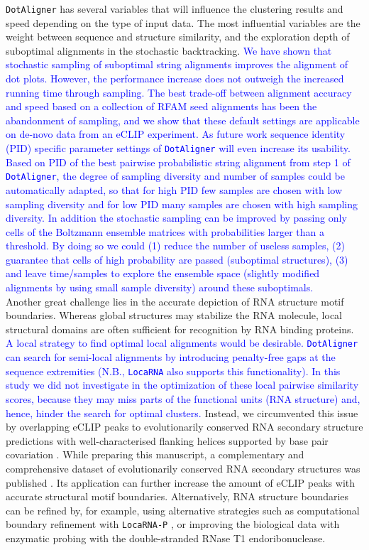 \documentclass{bmcart}
\newcommand\dotaligner{\texttt{DotAligner}}
\newcommand\locarna{\texttt{LocaRNA}}
\begin{document}
\dotaligner{} has several variables that will influence the clustering results and 
speed depending on the type of input data. The most influential variables are 
the weight between sequence and structure similarity,
and the exploration depth of suboptimal alignments in the stochastic
backtracking.
\textcolor{blue} {
We have shown that stochastic sampling of suboptimal string alignments improves
the alignment of dot plots. However, the performance increase does not outweigh
the increased running time through sampling. The best trade-off between
alignment accuracy and speed based on a collection of RFAM seed alignments has
been the abandonment of sampling, and we show that these default settings are
applicable on de-novo data from an eCLIP experiment.  As future work sequence
identity (PID) specific parameter settings of \dotaligner{} will even increase its
usability. Based on PID of the best pairwise probabilistic
string alignment from step 1 of \dotaligner, the degree of sampling diversity
and number of samples could be automatically
adapted, so that for high PID few samples are chosen with low sampling diversity and for
low PID many samples are chosen with high sampling diversity.
In addition the stochastic sampling can be improved by passing only
cells of the Boltzmann ensemble matrices with probabilities larger than a
threshold. By doing so we could (1) reduce the number of useless
samples, (2) guarantee that cells of high probability are passed (suboptimal
structures), (3) and leave time/samples to explore the ensemble space (slightly
modified alignments by using small sample diversity) around these suboptimals.}
\\

Another great challenge lies in the accurate depiction of RNA structure motif boundaries. 
Whereas global structures may stabilize the RNA molecule, local
structural domains are often sufficient for recognition by RNA binding
proteins.
\textcolor{blue}{ A local strategy to find optimal local alignments would be
desirable. \dotaligner{} can search for semi-local alignments by introducing
penalty-free gaps at the sequence extremities (N.B., \locarna{} also supports
this functionality). In this study we did not investigate in the optimization
of these local pairwise similarity scores, because they may miss parts of the
functional units (RNA structure) and, hence, hinder the search for optimal
clusters.} Instead, we circumvented this issue by overlapping eCLIP peaks to
evolutionarily conserved RNA secondary structure predictions with
well-characterised flanking helices supported by base pair covariation
\cite{smith2013widespread}.  While preparing this manuscript, a complementary
and comprehensive dataset of evolutionarily conserved RNA secondary structures
was published \cite{seemann2017identification}. Its application can further
increase the amount of eCLIP peaks with accurate structural motif boundaries.
Alternatively, RNA structure boundaries can be refined by, for example, using
alternative strategies such as computational boundary refinement with 
\texttt{LocaRNA-P} \cite{will2012locarna}, or improving the biological data
with enzymatic probing with the double-stranded RNase T1 endoribonuclease. \\
\end{document}
